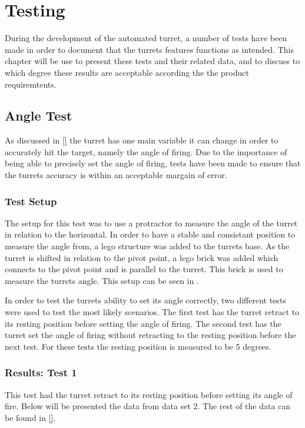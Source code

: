 \chapter{Testing}
During the development of the automated turret, a number of tests have been made
in order to document that the turrets features functions as intended. This
chapter will be use to present these tests and their related data, and to
discuss to which degree these results are acceptable according the the product
requiremtents.

\section{Angle Test}
As discussed in \autoref{} the turret has one main variable it can change in
order to accurately hit the target, namely the angle of firing. Due to the
importance of being able to precisely set the angle of firing, tests have been
made to ensure that the turrets accuracy is within an acceptable margain of
error.

\subsection{Test Setup}
The setup for this test was to use a protractor to measure the angle of the
turret in relation to the horizontal. In order to have a stable and
consistant position to measure the angle from, a lego structure was added to the
turrets base. As the turret is shifted in relation to the pivot point, a lego
brick was added which connects to the pivot point and is parallel to the turret.
This brick is used to measure the turrets angle. This setup can be seen in
.

In order to test the turrets ability to set its angle correctly, two different
tests were used to test the most likely scenarios. The first test has the turret
retract to its resting position before setting the angle of firing. The second
test has the turret set the angle of firing without retracting to the resting
position before the next test. For these tests the resting position is measured
to be 5 degrees.

\subsection{Results: Test 1}
This test had the turret retract to its resting position before setting its
angle of fire. Below will be presented the data from data set 2. The rest
of the data can be found in \autoref{}.

